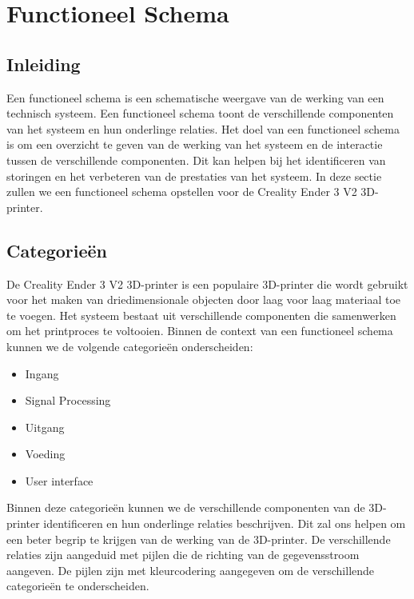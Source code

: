 \documentclass{article}
\begin{document}
\newpage

\section{Functioneel Schema}
\subsection{Inleiding}
Een functioneel schema is een schematische weergave van de werking van een technisch systeem. Een functioneel schema toont de verschillende componenten van het systeem en hun onderlinge relaties. Het doel van een functioneel schema is om een overzicht te geven van de werking van het systeem en de interactie tussen de verschillende componenten. Dit kan helpen bij het identificeren van storingen en het verbeteren van de prestaties van het systeem. In deze sectie zullen we een functioneel schema opstellen voor de Creality Ender 3 V2 3D-printer.

\subsection{Categorieën}
De Creality Ender 3 V2 3D-printer is een populaire 3D-printer die wordt gebruikt voor het maken van driedimensionale objecten door laag voor laag materiaal toe te voegen. Het systeem bestaat uit verschillende componenten die samenwerken om het printproces te voltooien. Binnen de context van een functioneel schema kunnen we de volgende categorieën onderscheiden:
\begin{itemize}
  \item Ingang
  \item Signal Processing
  \item Uitgang
  \item Voeding
  \item User interface
\end{itemize}

Binnen deze categorieën kunnen we de verschillende componenten van de 3D-printer identificeren en hun onderlinge relaties beschrijven. Dit zal ons helpen om een beter begrip te krijgen van de werking van de 3D-printer. De verschillende relaties zijn aangeduid met pijlen die de richting van de gegevensstroom aangeven. De pijlen zijn met kleurcodering aangegeven om de verschillende categorieën te onderscheiden.
\end{document}
